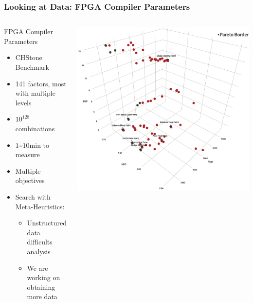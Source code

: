 \documentclass[10pt, compress, aspectratio=169, xcolor={table,usenames,dvipsnames}]{beamer}
\begin{document}
\begin{frame}
    \frametitle{Looking at Data: FPGA Compiler Parameters}
    \begin{columns}[c]
            \begin{block}{FPGA Compiler Parameters}
                \begin{itemize}
                    \item \alert{CHStone Benchmark}
                    \item \alert{141} factors, \alert{most with multiple
                        levels}
                    \item \alert{$10^{128}$} combinations
                    \item \alert{$1$\textasciitilde$10$min} to measure
                    \item \alert{Multiple objectives}
                    \item \alert{Search with Meta-Heuristics}:
                        \begin{itemize}
                            \item \alert{Unstructured data difficults analysis}
                            \item We are working on \alert{obtaining more data}
                        \end{itemize}
                \end{itemize}
            \end{block}

            \begin{block}{}
                \vspace{-.4cm}
                \includegraphics[width=.8\textwidth]{fpga_space}
            \end{block}

    \end{columns}
\end{frame}
\end{document}
